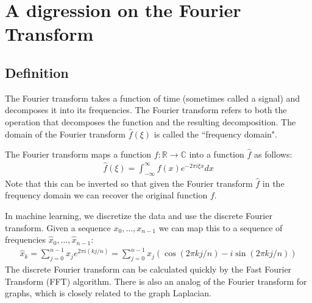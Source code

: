 \chapter{A digression on the Fourier Transform}

\section{Definition}

The Fourier transform takes a function of time (sometimes called a signal) and decomposes it into its frequencies. The Fourier transform refers to both the operation that decomposes the function and the resulting decomposition. The domain of the Fourier transform $\hat{f}(\xi)$ is called the ``frequency domain".

The Fourier transform maps a function $ f: \mathbb{R} \to  \mathbb{C}$ into a function $\hat f$ as follows:
\begin{align}
    \hat f(\xi) = \int_{-\infty}^\infty f(x) e^{-2\pi i \xi x}dx
\end{align}
Note that this can be inverted so that given the Fourier transform $ \hat f $ in the frequency domain we can recover the original function $ f$.

In machine learning, we discretize the data and use the discrete Fourier transform. Given a sequence $x_0,\dots, x_{n-1}$ we can map this to a sequence of frequencies $ \hat x_0,\dots, \hat x_{n-1}$:
\begin{align}
    \hat x_k = \sum_{j=0}^{n-1} x_j e^{2\pi i (kj/n)} = \sum_{j=0}^{n-1} x_j (\cos(2\pi kj/n) - i\sin(2\pi kj/n))
\end{align}
The discrete Fourier transform can be calculated quickly by the Fast Fourier Transform (FFT) algorithm. There is also an analog of the Fourier transform for graphs, which is closely related to the graph Laplacian.